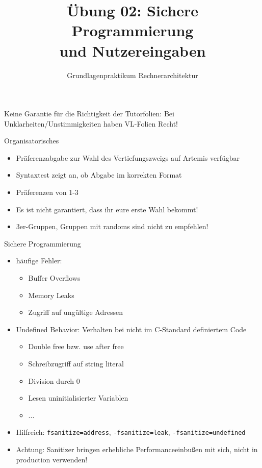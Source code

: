 

\title{Übung 02: Sichere Programmierung\\ und Nutzereingaben}
\subtitle{Grundlagenpraktikum Rechnerarchitektur}
\date{}



\maketitle

\begin{frame}[c]{}{}
	\begin{center}
		\LARGE  Keine Garantie für die Richtigkeit der Tutorfolien: Bei Unklarheiten/Unstimmigkeiten
		haben VL-Folien Recht!
	\end{center}
\end{frame}

\begin{frame}[c]{Organisatorisches}{}
	\begin{itemize}
		\item Präferenzabgabe zur Wahl des Vertiefungszweigs auf Artemis verfügbar
		\item Syntaxtest zeigt an, ob Abgabe im korrekten Format
		\item Präferenzen von 1-3
		\item Es ist nicht garantiert, dass ihr eure erste Wahl bekommt!
		\item 3er-Gruppen, Gruppen mit randoms sind nicht zu empfehlen!
	\end{itemize}
\end{frame}


\begin{frame}[c, fragile]{Sichere Programmierung}{}
	\begin{itemize}
		\item häufige Fehler:
		      \begin{itemize}
			      \item Buffer Overflows
			      \item Memory Leaks
			      \item Zugriff auf ungültige Adressen
		      \end{itemize}
		\item Undefined Behavior: Verhalten bei nicht im C-Standard definiertem Code
		      \begin{itemize}
			      \item Double free bzw. use after free
			      \item Schreibzugriff auf string literal
			      \item Division durch 0
			      \item Lesen uninitialisierter Variablen
			      \item ...
		      \end{itemize}
		\item Hilfreich: \verb|fsanitize=address|, \verb|-fsanitize=leak|, \verb|-fsanitize=undefined|
		\item Achtung: Sanitizer bringen erhebliche Performanceeinbußen mit sich, nicht in production verwenden!
	\end{itemize}
\end{frame}

